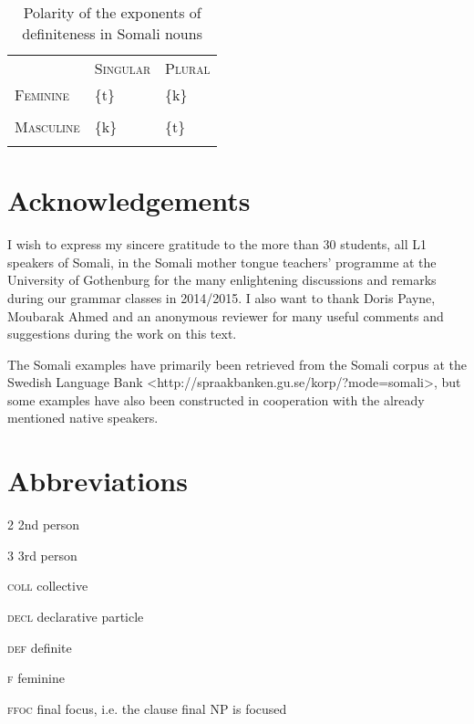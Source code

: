 \documentclass[output=paper]{langsci/langscibook}
\begin{document}
\begin{table}
\caption{Polarity of the exponents of definiteness in Somali nouns}
\label{tab:15}

\begin{tabularx}{\textwidth}{XXX} & \textsc{Singular}& \textsc{Plural}\par\\
\lsptoprule
 \textsc{Feminine}& \{t\}& \{k\}\par\\
\hhline{--~} &  & \\
\hhline{~~-}
 \textsc{Masculine}& \{k\}& \{t\}\par\\
\lspbottomrule
\end{tabularx}

\end{table} 

\section*{Acknowledgements}

I wish to express my sincere gratitude to the more than 30 students, all L1 speakers of Somali, in the Somali mother tongue teachers’ programme at the University of Gothenburg for the many enlightening discussions and remarks during our grammar classes in 2014/2015. I also want to thank Doris Payne, Moubarak Ahmed and an anonymous reviewer for many useful comments and suggestions during the work on this text.

The Somali examples have primarily been retrieved from the Somali corpus at the Swedish Language Bank {\textless}http://spraakbanken.gu.se/korp/?mode=somali{\textgreater}, but some examples have also been constructed in cooperation with the already mentioned native speakers.

\section*{Abbreviations}

2  2nd person

3  3rd person

\textsc{coll}  collective

\textsc{decl}  declarative particle

\textsc{def}  definite

\textsc{f}  feminine

\textsc{ffoc}  final focus, i.e. the clause final NP is focused
\end{document}
